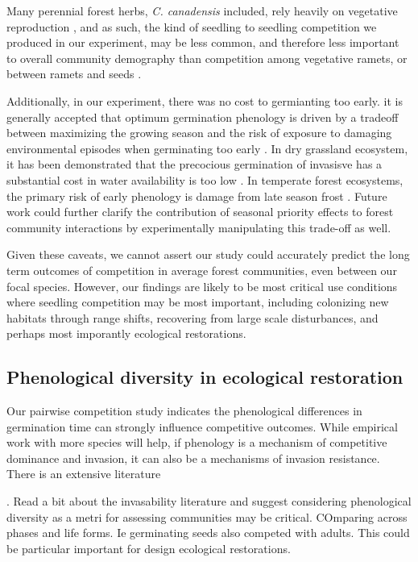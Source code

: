 \documentclass{article}\usepackage[]{graphicx}\usepackage[]{color}
\begin{document}
Many perennial forest herbs, \textit{C. canadensis} included, rely heavily on vegetative reproduction \citep{}, and as such, the kind of seedling to seedling competition we produced in our experiment, may be less common, and therefore less important to overall community demography than competition among vegetative ramets, or between ramets and seeds \citep{}. 

Additionally, in our experiment, there was no cost to germianting too early. it is generally accepted that optimum germination phenology is driven by a tradeoff between maximizing the growing season and the risk of exposure to damaging environmental episodes when germinating too early \citep{}. In dry grassland ecosystem, it has been demonstrated that the precocious germination of invasisve has a substantial cost in water availability is too low \citep{}. In temperate forest ecosystems, the primary risk of early phenology is damage from late season frost \citep{}. Future work could further clarify the contribution of seasonal priority effects to forest community interactions by experimentally manipulating this trade-off as well.

Given these caveats, we cannot assert our study could accurately predict the long term outcomes of competition in average forest communities, even between our focal species. However, our findings are likely to be most critical use conditions where seedling competition may be most important, including colonizing new habitats through range shifts, recovering from large scale disturbances, and perhaps most imporantly ecological restorations.

\subsection*{Phenological diversity in ecological restoration}
Our pairwise competition study indicates the phenological differences in germination time can strongly influence competitive outcomes. While empirical work with more species will help, if phenology is a mechanism of competitive dominance and invasion, it can also be a mechanisms of invasion resistance. There is an extensive literature 


. Read a bit about the invasability literature and suggest considering phenological diversity as a metri for assessing communities may be critical. COmparing across phases and life forms. Ie germinating seeds also competed with adults. This could be particular important for design ecological restorations. 
\end{document}
